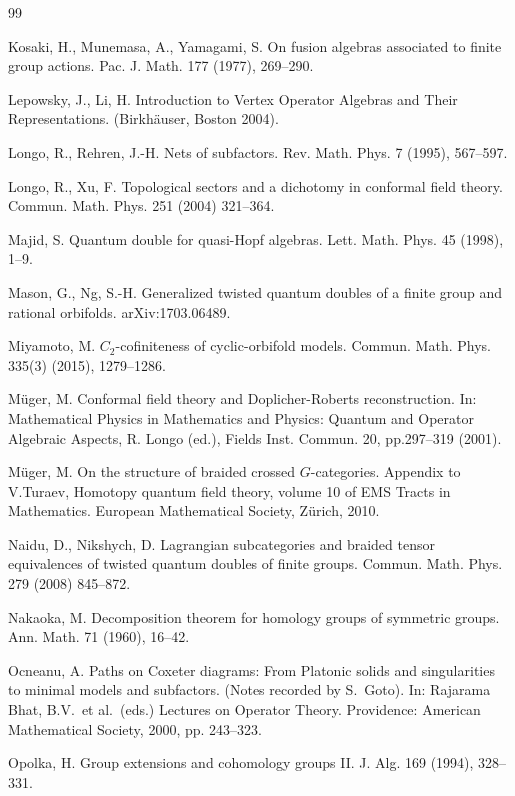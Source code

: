 \documentclass[12pt]{article}
\numberwithin{equation}{section}
\begin{document}
\begin{thebibliography}{99}
\begin{scriptsize}
 {Kosaki, H., Munemasa, A., Yamagami, S.} {On fusion algebras associated to finite group actions.}
Pac. J. Math. 177 (1977), 269--290.


 {Lepowsky, J.,  Li, H.} {Introduction to
Vertex Operator Algebras and Their Representations.} (Birkh\"auser, Boston
2004).

{Longo, R.,  Rehren, J.-H.} {Nets of subfactors.} {Rev. Math. Phys.} {7} (1995), 567--597.

 {Longo, R., Xu, F.} {Topological sectors and a dichotomy in conformal field theory.} {Commun. Math. Phys.} 251 (2004) 321--364.

 {Majid, S.} {Quantum double for quasi-Hopf algebras.} Lett. Math. Phys. 45 (1998), 1--9.

 {Mason, G., Ng, S.-H.} {Generalized twisted quantum doubles of a finite group and rational orbifolds.} {arXiv:1703.06489.}

 {Miyamoto, M.} {$C_2$-cofiniteness of cyclic-orbifold models.} {Commun. Math. Phys.} 335(3) (2015), 1279--1286.

 {M\"uger, M.} {Conformal field theory and Doplicher-Roberts reconstruction.} {In: Mathematical Physics
in Mathematics and Physics: Quantum and Operator Algebraic Aspects,} R. Longo (ed.), Fields Inst.
Commun. 20, pp.297--319 (2001).

 {M\"uger, M.} {On the structure of braided crossed $G$-categories.} Appendix to V.Turaev, Homotopy quantum field theory, volume 10 of EMS Tracts in Mathematics. European Mathematical Society, Z\"urich, 2010.


 {Naidu, D., Nikshych, D.} {Lagrangian subcategories and braided tensor equivalences of 
twisted quantum doubles of finite groups.} {Commun. Math. Phys.} 279 (2008) 845--872.


 {Nakaoka, M.} {Decomposition theorem for homology groups of symmetric groups.} {Ann. Math.} 71 (1960), 16--42.


{Ocneanu, A.} {Paths on Coxeter diagrams: From Platonic solids and
singularities to minimal models and subfactors.} (Notes recorded by S.\ Goto).
In: Rajarama Bhat, B.V.\ et al.\ (eds.) Lectures on Operator Theory.
Providence: American Mathematical Society, 2000, pp. 243--323. 



 {Opolka, H.} {Group extensions and cohomology groups II.} {J. Alg.} {169} (1994), 328--331. 


\end{scriptsize}
\end{thebibliography}
\end{document}
